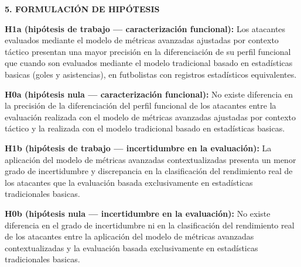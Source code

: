 \hypertarget{sec:hipotesis}{}%
\begin{center}
    {\Large\bfseries 5. FORMULACIÓN DE HIPÓTESIS}
\end{center}
\vspace{1em}

\noindent\textbf{H1a (hipótesis de trabajo --- caracterización funcional):} Los atacantes evaluados mediante el modelo de métricas avanzadas ajustadas por contexto táctico presentan una mayor precisión en la diferenciación de su perfil funcional que cuando son evaluados mediante el modelo tradicional basado en estadísticas basicas (goles y asistencias), en futbolistas con registros estadísticos equivalentes.\par\vspace{0.8em}

\noindent\textbf{H0a (hipótesis nula --- caracterización funcional):} No existe diferencia en la precisión de la diferenciación del perfil funcional de los atacantes entre la evaluación realizada con el modelo de métricas avanzadas ajustadas por contexto táctico y la realizada con el modelo tradicional basado en estadísticas basicas.\par\vspace{1.2em}

\noindent\textbf{H1b (hipótesis de trabajo --- incertidumbre en la evaluación):} La aplicación del modelo de métricas avanzadas contextualizadas presenta un menor grado de incertidumbre y discrepancia en la clasificación del rendimiento real de los atacantes que la evaluación basada exclusivamente en estadísticas tradicionales basicas.\par\vspace{0.8em}

\noindent\textbf{H0b (hipótesis nula --- incertidumbre en la evaluación):} No existe diferencia en el grado de incertidumbre ni en la clasificación del rendimiento real de los atacantes entre la aplicación del modelo de métricas avanzadas contextualizadas y la evaluación basada exclusivamente en estadísticas tradicionales basicas.